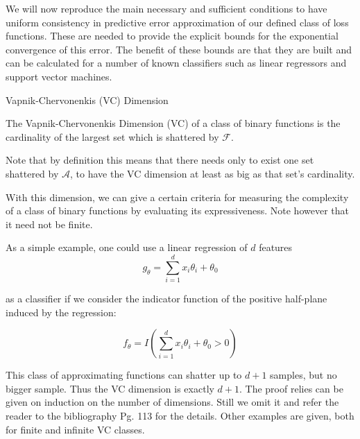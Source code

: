 \begin{appendices}
We will now reproduce the main necessary and sufficient conditions to have uniform consistency in predictive error approximation of our defined class of loss functions.
These are needed to provide the explicit bounds for the exponential convergence of this error.
The benefit of these bounds are that they are built and can be calculated for a number of known classifiers such as linear regressors and support vector machines.


\begin{definition}{Vapnik-Chervonenkis (VC) Dimension}

The Vapnik-Chervonenkis Dimension (VC) of a class of binary functions is the cardinality of the largest set which is shattered by $\mathcal {F}$.
\end{definition}

Note that by definition this means that there needs only to exist one set shattered by $\mathcal {A}$, to have the VC dimension at least as big as that set's cardinality.

With this dimension, we can give a certain criteria for measuring the complexity of a class of binary functions by evaluating its expressiveness.
Note however that it need not be finite.

As a simple example, one could use a linear regression of $d$ features
\begin{equation}
g_{\theta} = \sum_{i=1}^d x_i \theta_i + \theta_0
\end{equation}

 as a classifier if we consider the indicator function of the positive half-plane induced by the regression:

\begin{equation}
f_{\theta} = I(\sum_{i=1}^d x_i \theta_i + \theta_0 > 0)
\end{equation}

This class of approximating functions can shatter up to $d+1$ samples, but no bigger sample.
Thus the VC dimension is exactly $d+1$.
The proof relies can be given on induction on the number of dimensions. 
Still we omit it and refer the reader to the bibliography \textcite{cherkassky-learning2007} Pg.
113 for the details. 
Other examples are given, both for finite and infinite VC classes.



\end{appendices}
